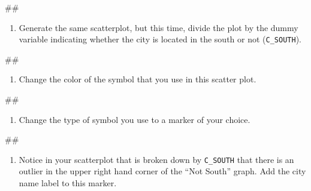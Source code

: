 \documentclass[
]{book}
\newenvironment{Shaded}{\begin{snugshade}}{\end{snugshade}}
\newcommand{\NormalTok}[1]{#1}
\providecommand{\tightlist}{%
  \setlength{\itemsep}{0pt}\setlength{\parskip}{0pt}}
\begin{document}
\begin{Shaded}
\begin{Highlighting}[]
\NormalTok{\#\#}
\end{Highlighting}
\end{Shaded}

\begin{enumerate}
\def\labelenumi{\arabic{enumi}.}
\setcounter{enumi}{2}
\tightlist
\item
  Generate the same scatterplot, but this time, divide the plot by the dummy variable indicating whether the city is located in the south or not (\texttt{C\_SOUTH}).
\end{enumerate}

\begin{Shaded}
\begin{Highlighting}[]
\NormalTok{\#\#}
\end{Highlighting}
\end{Shaded}

\begin{enumerate}
\def\labelenumi{\arabic{enumi}.}
\setcounter{enumi}{3}
\tightlist
\item
  Change the color of the symbol that you use in this scatter plot.
\end{enumerate}

\begin{Shaded}
\begin{Highlighting}[]
\NormalTok{\#\#}
\end{Highlighting}
\end{Shaded}

\begin{enumerate}
\def\labelenumi{\arabic{enumi}.}
\setcounter{enumi}{4}
\tightlist
\item
  Change the type of symbol you use to a marker of your choice.
\end{enumerate}

\begin{Shaded}
\begin{Highlighting}[]
\NormalTok{\#\#}
\end{Highlighting}
\end{Shaded}

\begin{enumerate}
\def\labelenumi{\arabic{enumi}.}
\setcounter{enumi}{5}
\tightlist
\item
  Notice in your scatterplot that is broken down by \texttt{C\_SOUTH} that there is an outlier in the upper right hand corner of the ``Not South'' graph. Add the city name label to this marker.
\end{enumerate}
\end{document}
